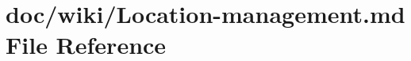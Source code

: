 \hypertarget{_location-management_8md}{}\section{doc/wiki/\+Location-\/management.md File Reference}
\label{_location-management_8md}
